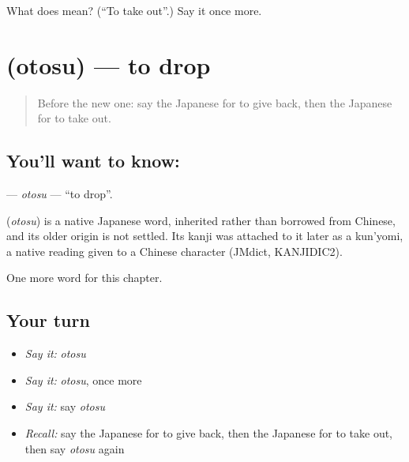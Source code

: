 \begin{tcolorbox}[breakable,colback=teal!4,colframe=teal!35!black,title={Before you move on}]
What does  mean? (\textquotedblleft{}To take out\textquotedblright{}.) Say it once more.
\end{tcolorbox}
\section[\texorpdfstring{\ja{おとす} (otosu)}{おとす (otosu)}]{ (otosu) — to drop}

\label{lesson:JA-C31-otosu}



\begin{quote}
Before the new one: say the Japanese for to give back, then the Japanese for to take out.
\end{quote}

\subsection*{You'll want to know: }
\textbf{} — \emph{otosu} — \textquotedblleft{}to drop\textquotedblright{}.

\begin{cousinweb}
\textbf{} (\emph{otosu}) is a native Japanese word, inherited rather than borrowed from Chinese, and its older origin is not settled. Its kanji was attached to it later as a kun'yomi, a native reading given to a Chinese character (JMdict, KANJIDIC2).
\end{cousinweb}

\begin{grammarlens}[title={What you've built}]
One more word for this chapter.
\end{grammarlens}

\subsection*{Your turn}
\begin{itemize}
\raggedright
  \item \emph{Say it:} \emph{otosu}
  \item \emph{Say it:} \emph{otosu}, once more
  \item \emph{Say it:} say \emph{otosu}
  \item \emph{Recall:} say the Japanese for to give back, then the Japanese for to take out, then say \emph{otosu} again
\end{itemize}

